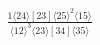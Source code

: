 \documentclass[varwidth, border=5pt]{standalone}
\begin{document}
\begin{my}
$\begin{gathered}
\scriptscriptstyle\frac{1⟨24⟩[23]⟨25⟩^2⟨15⟩}{⟨12⟩^3⟨23⟩[34]⟨35⟩}
\end{gathered}$
\end{my}
\end{document}
